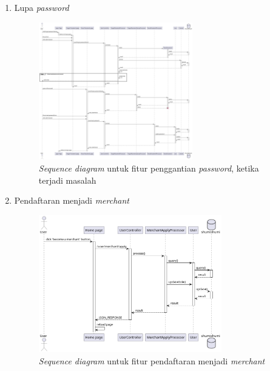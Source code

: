 \documentclass[a4paper]{article}
\begin{document}
\begin{enumerate}
\begin{enumerate}
        \item Lupa \textit{password}
        \begin{figure}[h]
            \centering
            \includegraphics*[height=6cm]{diagram/sequence diagram/7. forgot password/forgot password.png}
            \caption{\textit{Sequence diagram} untuk fitur penggantian \textit{password}, ketika terjadi masalah}
        \end{figure}
        \item Pendaftaran menjadi \textit{merchant}
        \begin{figure}[h]
            \centering
            \includegraphics*[height=6cm]{diagram/sequence diagram/8. become a merchant/become a merchant.png}
            \caption{\textit{Sequence diagram} untuk fitur pendaftaran menjadi \textit{merchant}}
        \end{figure}
        \newpage


\end{enumerate}
\end{enumerate}
\end{document}
